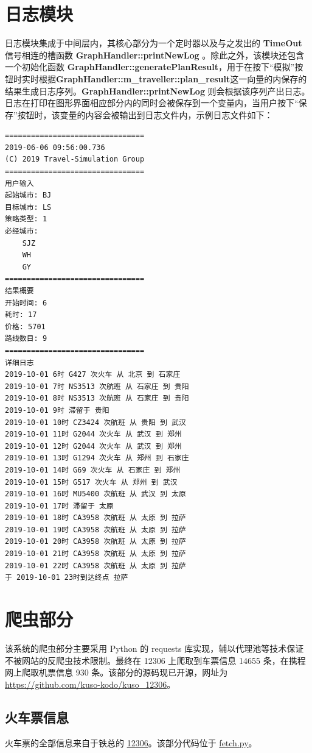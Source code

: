 \documentclass[lang=cn,blue]{elegantbook}
\begin{document}
\chapter{日志模块}
日志模块集成于中间层内，其核心部分为一个定时器以及与之发出的 \textbf{TimeOut} 信号相连的槽函数 \textbf{GraphHandler::printNewLog
}。除此之外，该模块还包含一个初始化函数 \textbf{GraphHandler::generatePlanResult}，用于在按下``模拟''按钮时实时根据\textbf{GraphHandler::m\_traveller::plan\_result}这一向量的内保存的结果生成日志序列。\textbf{GraphHandler::printNewLog} 则会根据该序列产出日志。日志在打印在图形界面相应部分内的同时会被保存到一个变量内，当用户按下``保存''按钮时，该变量的内容会被输出到日志文件内，示例日志文件如下：

\begin{lstlisting}
================================
2019-06-06 09:56:00.736    
(C) 2019 Travel-Simulation Group
================================
用户输入
起始城市: BJ
目标城市: LS
策略类型: 1
必经城市:
	SJZ
	WH
	GY
================================
结果概要
开始时间: 6
耗时: 17
价格: 5701
路线数目: 9
================================
详细日志
2019-10-01 6时 G427 次火车 从 北京 到 石家庄
2019-10-01 7时 NS3513 次航班 从 石家庄 到 贵阳
2019-10-01 8时 NS3513 次航班 从 石家庄 到 贵阳
2019-10-01 9时 滞留于 贵阳
2019-10-01 10时 CZ3424 次航班 从 贵阳 到 武汉
2019-10-01 11时 G2044 次火车 从 武汉 到 郑州
2019-10-01 12时 G2044 次火车 从 武汉 到 郑州
2019-10-01 13时 G1294 次火车 从 郑州 到 石家庄
2019-10-01 14时 G69 次火车 从 石家庄 到 郑州
2019-10-01 15时 G517 次火车 从 郑州 到 武汉
2019-10-01 16时 MU5400 次航班 从 武汉 到 太原
2019-10-01 17时 滞留于 太原
2019-10-01 18时 CA3958 次航班 从 太原 到 拉萨
2019-10-01 19时 CA3958 次航班 从 太原 到 拉萨
2019-10-01 20时 CA3958 次航班 从 太原 到 拉萨
2019-10-01 21时 CA3958 次航班 从 太原 到 拉萨
2019-10-01 22时 CA3958 次航班 从 太原 到 拉萨
于 2019-10-01 23时到达终点 拉萨
\end{lstlisting}

\chapter{爬虫部分}
该系统的爬虫部分主要采用 Python 的 requests 库实现，辅以代理池等技术保证不被网站的反爬虫技术限制。最终在 12306 上爬取到车票信息 14655 条，在携程网上爬取机票信息 930 条。该部分的源码现已开源，网址为 \href{https://github.com/kuso-kodo/kuso\_12306}{https://github.com/kuso-kodo/kuso\_12306}。

\section{火车票信息}
火车票的全部信息来自于铁总的 \href{https://www.12306.cn}{12306}。该部分代码位于 \href{https://github.com/kuso-kodo/kuso_12306/blob/master/src_12306/fetch.py}{fetch.py}。
\end{document}
